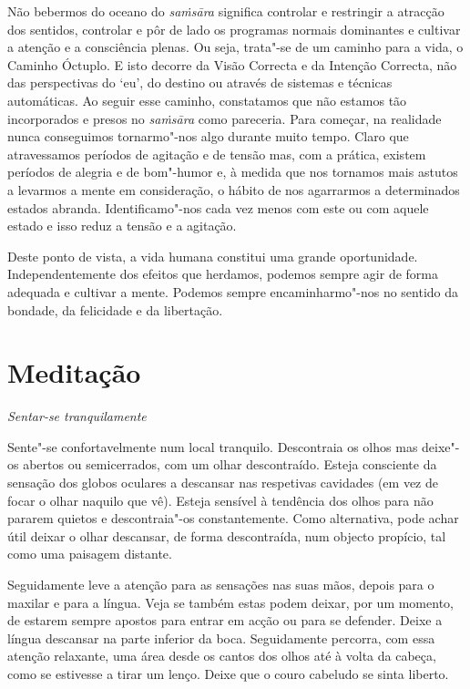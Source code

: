 Não bebermos do oceano do \emph{saṁsāra} significa controlar e restringir a
atracção dos sentidos, controlar e pôr de lado os programas normais dominantes e
cultivar a atenção e a consciência plenas. Ou seja, trata"-se de um caminho para
a vida, o Caminho Óctuplo. E isto decorre da Visão Correcta e da Intenção
Correcta, não das perspectivas do `eu', do destino ou através de sistemas e
técnicas automáticas. Ao seguir esse caminho, constatamos que não estamos tão
incorporados e presos no \emph{saṁsāra} como pareceria. Para começar, na
realidade nunca conseguimos tornarmo"-nos algo durante muito tempo. Claro que
atravessamos períodos de agitação e de tensão mas, com a prática, existem
períodos de alegria e de bom"-humor e, à medida que nos tornamos mais astutos a
levarmos a mente em consideração, o hábito de nos agarrarmos a determinados
estados abranda. Identificamo"-nos cada vez menos com este ou com aquele estado e
isso reduz a tensão e a agitação.

Deste ponto de vista, a vida humana constitui uma grande oportunidade.
Independentemente dos efeitos que herdamos, podemos sempre agir de forma
adequada e cultivar a mente. Podemos sempre encaminharmo"-nos no sentido da
bondade, da felicidade e da libertação.

\clearpage

\section[Meditação: sentar-se tranquilamente]{Meditação}

{\centering
\subSectionFont\selectfont
\textit{Sentar-se tranquilamente}
\par}

\bigskip

Sente"-se confortavelmente num local tranquilo. Descontraia os olhos mas
deixe"-os abertos ou semicerrados, com um olhar descontraído. Esteja consciente
da sensação dos globos oculares a descansar nas respetivas cavidades (em vez de
focar o olhar naquilo que vê). Esteja sensível à tendência dos olhos para não
pararem quietos e descontraia"-os constantemente. Como alternativa, pode achar
útil deixar o olhar descansar, de forma descontraída, num objecto propício, tal
como uma paisagem distante.

Seguidamente leve a atenção para as sensações nas suas mãos, depois para o
maxilar e para a língua. Veja se também estas podem deixar, por um momento, de
estarem sempre apostos para entrar em acção ou para se defender. Deixe a língua
descansar na parte inferior da boca. Seguidamente percorra, com essa atenção
relaxante, uma área desde os cantos dos olhos até à volta da cabeça, como se
estivesse a tirar um lenço. Deixe que o couro cabeludo se sinta liberto.

